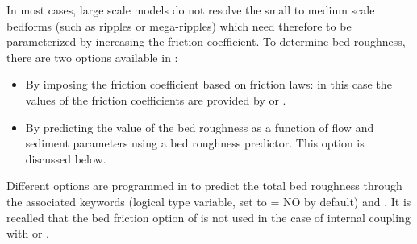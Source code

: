 In most cases, large scale models do not resolve the small to medium
scale bedforms (such as ripples or mega-ripples) which need therefore to be parameterized by increasing the friction coefficient. To determine bed roughness, there are two options available in \gaia{}:
\begin{itemize}
\item By imposing the friction coefficient based on friction laws: in this case the values of the friction coefficients are provided by  or .
\item By predicting the value of the bed roughness as a function of flow and sediment parameters using a bed roughness predictor. This option is discussed below.
\end{itemize}
Different options are programmed in \gaia to predict the total bed
roughness through the associated keywords  (logical type variable, set to {\ttfamily = NO} by default) and . It is recalled that the bed friction option of \gaia is not
used in the case of internal coupling with  or .

